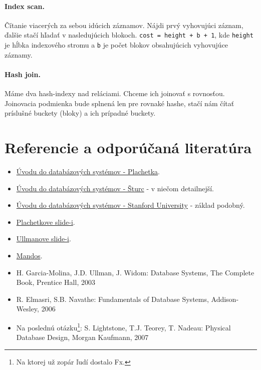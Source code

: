 \documentclass[10pt,a4paper]{article}
\begin{document}
\paragraph{Index scan.}
Čítanie viacerých za sebou idúcich záznamov.
Nájdi prvý vyhovujúci záznam, ďalšie stačí hľadať v nasledujúcich blokoch.
\verb|cost = height + b + 1|, kde \verb|height| je hĺbka indexového stromu a
\verb|b| je počet blokov obsahujúcich vyhovujúce záznamy.

\paragraph{Hash join.}
Máme dva hash-indexy nad reláciami. Chceme ich joinovať s rovnosťou. Joinovacia podmienka bude splnená len pre rovnaké hashe, stačí nám čítať príslušné buckety (bloky) a ich prípadné buckety. 

\clearpage
\section*{Referencie a odporúčaná literatúra}
\begin{itemize}                                
\item \href{http://www.dcs.fmph.uniba.sk/~plachetk/TEACHING/DB2011/index.html}{Úvodu do databázových systémov - Plachetka}.        
\item \href{http://www.dcs.fmph.uniba.sk/~sturc/databazy/uvod/}{Úvodu do databázových systémov - Šturc} - v niečom detailnejší.        
\item \href{http://infolab.stanford.edu/~widom/cs145/}{Úvodu do databázových systémov - Stanford University} - základ podobný.


\item \href{http://csip.sk/uploads/plachetka\_uvod\_do\_databaz\_2011.pdf}{Plachetkove slide-i}.
\item \href{http://csip.sk/uploads/ullman.pdf}{Ullmanove slide-i}.
\item \href{http://fmfi-uk.hq.sk/Informatika/Uvod\%20Do\%20Databazovych\%20Systemov/prednasky/}{Mandos}.
\item H. Garcia-Molina, J.D. Ullman, J. Widom: Database Systems, The Complete Book, Prentice Hall, 2003
\item R. Elmasri, S.B. Navathe: Fundamentals of Database Systems, Addison-Wesley, 2006
\item Na poslednú otázku\footnote{
Na ktorej už zopár ľudí dostalo Fx.
}: S. Lightstone, T.J. Teorey, T. Nadeau: Physical Database Design, Morgan Kaufmann, 2007
\end{itemize}
\end{document}
